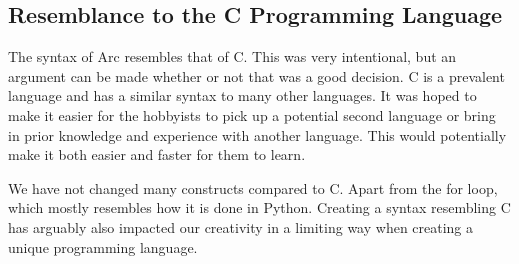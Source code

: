 \subsection{Resemblance to the C Programming Language}

The syntax of Arc resembles that of C. This was very intentional, but an argument can be made whether or not that was a good decision. C is a prevalent language and has a similar syntax to many other languages. It was hoped to make it easier for the hobbyists to pick up a potential second language or bring in prior knowledge and experience with another language. This would potentially make it both easier and faster for them to learn. 

We have not changed many constructs compared to C. Apart from the for loop, which mostly resembles how it is done in Python. Creating a syntax resembling C has arguably also impacted our creativity in a limiting way when creating a unique programming language. 